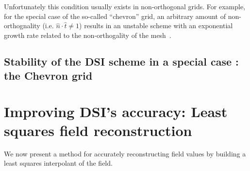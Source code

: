 \documentclass[12pt]{article}
\begin{document}
Unfortunately this condition usually exists in non-orthogonal grids.
For example, for the special case of the so-called ``chevron'' grid,
an arbitrary amount of non-orthognality (i.e. ${\hat n}\cdot{\hat
t}\ne1$) results in an unstable scheme with an exponential growth rate
related to the non-orthogality of the mesh~\cite{brandon}.

\subsection{Stability of the DSI scheme in a special case : the Chevron grid}\label{sec:chev}


\section{Improving DSI's accuracy: Least squares field reconstruction}
We now present a method for accurately reconstructing field values
by building a least squares interpolant of the field.   
\end{document}
